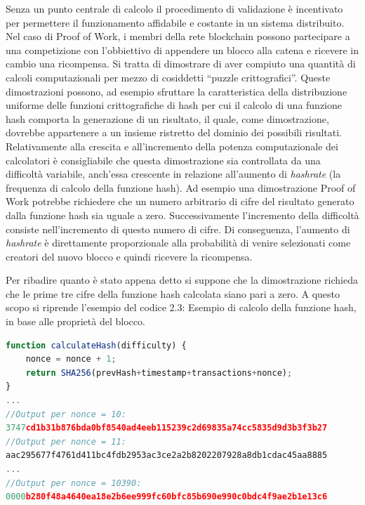 Senza un punto centrale di calcolo il procedimento di validazione è incentivato per permettere il funzionamento affidabile e costante in un sistema distribuito. Nel caso di Proof of Work, i membri della rete blockchain possono partecipare a una competizione con l’obbiettivo di appendere un blocco alla catena e ricevere in cambio una ricompensa. Si tratta di dimostrare di aver compiuto una quantità di calcoli computazionali per mezzo di cosiddetti “puzzle crittografici”. Queste dimostrazioni possono, ad esempio sfruttare la caratteristica della distribuzione uniforme delle funzioni crittografiche di hash per cui il calcolo di una funzione hash comporta la generazione di un risultato, il quale, come dimostrazione, dovrebbe appartenere a un insieme ristretto del dominio dei possibili risultati. Relativamente alla crescita e all'incremento della potenza computazionale dei calcolatori è consigliabile che questa dimostrazione sia controllata da una difficoltà variabile, anch’essa crescente in relazione all’aumento di \emph{hashrate} (la frequenza di calcolo della funzione hash). Ad esempio una dimostrazione Proof of Work potrebbe richiedere che un numero arbitrario di cifre del risultato generato dalla funzione hash sia uguale a zero. Successivamente l’incremento della difficoltà consiste nell’incremento di questo numero di cifre. Di conseguenza, l’aumento di \emph{hashrate} è direttamente proporzionale alla probabilità di venire selezionati come creatori del nuovo blocco e quindi ricevere la ricompensa.

Per ribadire quanto è stato appena detto si suppone che la dimostrazione richieda che le prime tre cifre della funzione hash calcolata siano pari a zero.
A questo scopo si riprende l'esempio del codice 2.3: Esempio di calcolo della funzione hash, in base alle proprietà del blocco. 
\\
\begin{lstlisting}[caption={Esempio di calcolo della funzione hash in base alle proprietà del blocco},language=JavaScript]
function calculateHash(difficulty) {
    nonce = nonce + 1;
    return SHA256(prevHash+timestamp+transactions+nonce);
}
...
//Output per nonce = 10:
3747cd1b31b876bda0bf8540ad4eeb115239c2d69835a74cc5835d9d3b3f3b27
//Output per nonce = 11:
aac295677f4761d411bc4fdb2953ac3ce2a2b8202207928a8db1cdac45aa8885
...
//Output per nonce = 10390:
0000b280f48a4640ea18e2b6ee999fc60bfc85b690e990c0bdc4f9ae2b1e13c6

\end{lstlisting}

